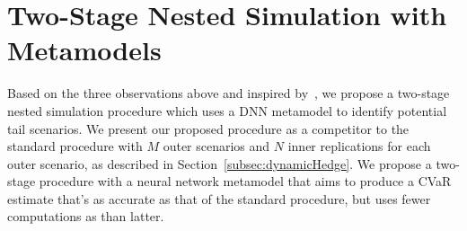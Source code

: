 \section{Two-Stage Nested Simulation with Metamodels} \label{sec2:metamodel2Stage}

Based on the three observations above and inspired by~\cite{dang2020efficient}, we propose a two-stage nested simulation procedure which uses a DNN metamodel to identify potential tail scenarios.
We present our proposed procedure as a competitor to the standard procedure with $M$ outer scenarios and $N$ inner replications for each outer scenario, as described in Section~\ref{subsec:dynamicHedge}.
We propose a two-stage procedure with a neural network metamodel that aims to produce a CVaR estimate that's as accurate as that of the standard procedure, but uses fewer computations as than latter.

    
    
        
